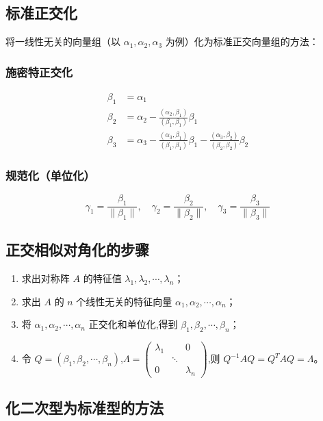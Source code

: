 \documentclass[UTF8]{ctexart}
\theoremstyle{remark}
\begin{document}
	\subsection{标准正交化}
	将一线性无关的向量组（以 \(\alpha_1, \alpha_2, \alpha_3\) 为例）化为标准正交向量组的方法：
	\subsubsection{施密特正交化}
	
	\begin{align*}
		\beta_1 &= \alpha_1\\
		\beta_2 &= \alpha_2 - \frac{(\alpha_2, \beta_1)}{(\beta_1, \beta_1)}\beta_1\\
		\beta_3 &= \alpha_3 - \frac{(\alpha_3, \beta_1)}{(\beta_1, \beta_1)}\beta_1 - \frac{(\alpha_3, \beta_2)}{(\beta_2, \beta_2)}\beta_2
	\end{align*}
	
	\subsubsection{规范化（单位化）}
	\[
	\gamma_1 = \frac{\beta_1}{\|\beta_1\|}, \quad \gamma_2 = \frac{\beta_2}{\|\beta_2\|}, \quad \gamma_3 = \frac{\beta_3}{\|\beta_3\|}
	\]
	
	\subsection{正交相似对角化的步骤}
	\begin{enumerate}
		\item 求出对称阵 \(A\) 的特征值 \(\lambda_1, \lambda_2, \cdots, \lambda_n\)；
		\item 求出 \(A\) 的 \(n\) 个线性无关的特征向量 \(\alpha_1, \alpha_2, \cdots, \alpha_n\)；
		\item 将 \(\alpha_1, \alpha_2, \cdots, \alpha_n\) 正交化和单位化,得到 \(\beta_1, \beta_2, \cdots, \beta_n\)；
		\item 令 \(Q = (\beta_1, \beta_2, \cdots, \beta_n)\),\(\Lambda = \begin{pmatrix}
			\lambda_1 & & 0 \\
			& \ddots & \\
			0 & & \lambda_n
		\end{pmatrix}\),则 \(Q^{-1}AQ = Q^TAQ = \Lambda\)。
	\end{enumerate}
	
	\subsection{化二次型为标准型的方法}
\end{document}

